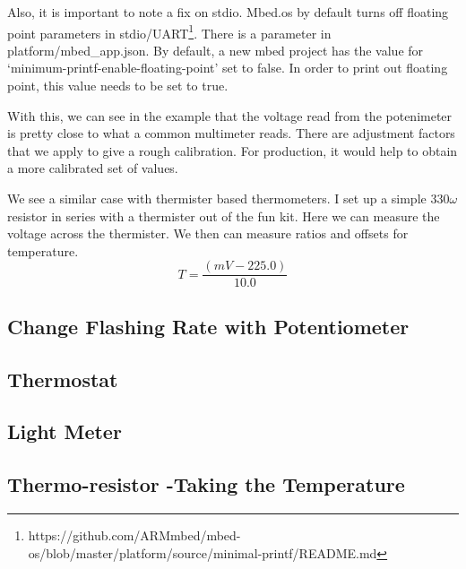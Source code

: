 \documentclass{article}
\begin{document}
Also, it is important to note a fix on stdio.  Mbed.os by default turns off floating point parameters in stdio/UART\footnote{https://github.com/ARMmbed/mbed-os/blob/master/platform/source/minimal-printf/README.md}.  
There is a parameter in platform/mbed\_app.json.  By default, a new mbed project has the value for `minimum-printf-enable-floating-point' set to false.  In order to print out floating point, this value needs to be set to true.  

With this, we can see in the example that the voltage read from the potenimeter is pretty close to what a common multimeter reads.  There are adjustment factors that we apply to give a rough calibration.  For production, it would help to obtain a more calibrated set of values.  

We see a similar case with thermister based thermometers.  I set up a simple $330\omega$ resistor in series with a thermister out of the fun kit.  Here we can measure the voltage across the thermister.  We then can measure ratios and offsets for temperature.  
\begin{equation}
	T = \frac{(mV - 225.0)}{10.0}
\end{equation}



\subsection{Change Flashing Rate with Potentiometer} %
\label{sub:change_flashing_rate_with_potentiometer}




\subsection{Thermostat} %
\label{sub:thermostat}


\subsection{Light Meter} %
\label{sub:light_meter}


\subsection{Thermo-resistor -Taking the Temperature} %
\label{sub:thermo_resistor_taking_the_temperature}
\end{document}
